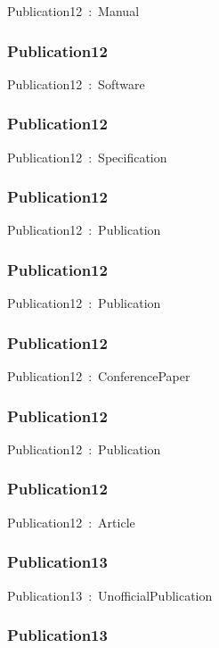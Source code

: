 \documentclass{article}
\begin{document}
Publication12~:~Manual

\subsubsection*{Publication12}

Publication12~:~Software

\subsubsection*{Publication12}

Publication12~:~Specification

\subsubsection*{Publication12}

Publication12~:~Publication

\subsubsection*{Publication12}

Publication12~:~Publication

\subsubsection*{Publication12}

Publication12~:~ConferencePaper

\subsubsection*{Publication12}

Publication12~:~Publication

\subsubsection*{Publication12}

Publication12~:~Article

\subsubsection*{Publication13}

Publication13~:~UnofficialPublication

\subsubsection*{Publication13}
\end{document}
